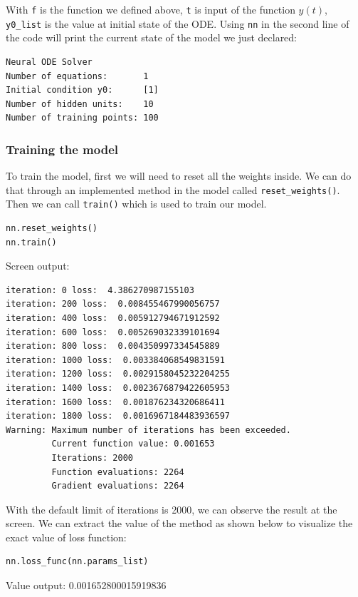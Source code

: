 \documentclass[a4paper]{article}
\numberwithin{equation}{section}
\begin{document}
With \texttt{f} is the function we defined above, \texttt{t} is input of the function \(y(t)\), \texttt{y0\_list} is the value at initial state of the ODE. Using \texttt{nn} in the second line of the code will print the current state of the model we just declared:
\begin{mdframed}[leftline=false,rightline=false,backgroundcolor=Turquoise!10,nobreak=true]
  \begin{verbatim}
Neural ODE Solver
Number of equations:       1
Initial condition y0:      [1]
Number of hidden units:    10
Number of training points: 100
    \end{verbatim}
\end{mdframed}

\subsubsection{Training the model}
To train the model, first we will need to reset all the weights inside. We can do that through an implemented method in the model called \texttt{reset\_weights()}. Then we can call \texttt{train()} which is used to train our model.
\begin{mdframed}[leftline=false,rightline=false,backgroundcolor=magenta!10,nobreak=true]
  \begin{verbatim}
nn.reset_weights()
nn.train()
    \end{verbatim}
\end{mdframed}
Screen output:
\begin{mdframed}[leftline=false,rightline=false,backgroundcolor=Turquoise!10,nobreak=true]
  \begin{verbatim}
iteration: 0 loss:  4.386270987155103
iteration: 200 loss:  0.008455467990056757
iteration: 400 loss:  0.005912794671912592
iteration: 600 loss:  0.005269032339101694
iteration: 800 loss:  0.004350997334545889
iteration: 1000 loss:  0.003384068549831591
iteration: 1200 loss:  0.0029158045232204255
iteration: 1400 loss:  0.0023676879422605953
iteration: 1600 loss:  0.001876234320686411
iteration: 1800 loss:  0.0016967184483936597
Warning: Maximum number of iterations has been exceeded.
         Current function value: 0.001653
         Iterations: 2000
         Function evaluations: 2264
         Gradient evaluations: 2264
    \end{verbatim}
\end{mdframed}
With the default limit of iterations is 2000, we can observe the result at the screen. We can extract the value of the method as shown below to visualize the exact value of loss function:
\begin{mdframed}[leftline=false,rightline=false,backgroundcolor=magenta!10,nobreak=true]
  \begin{verbatim}
nn.loss_func(nn.params_list)
    \end{verbatim}
\end{mdframed}
Value output: 0.001652800015919836
\end{document}
